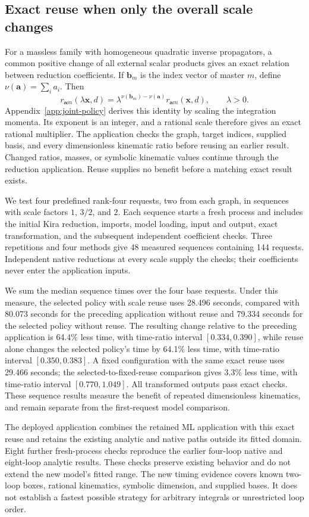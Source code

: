 \subsection{Exact reuse when only the overall scale changes}
For a massless family with homogeneous quadratic inverse propagators, a common positive change of all external scalar products gives an exact relation between reduction coefficients. If $\boldsymbol b_m$ is the index vector of master $m$, define $\nu(\boldsymbol a)=\sum_i a_i$. Then
\begin{equation}
 r_{\boldsymbol a m}(\lambda\boldsymbol x,d)
 =\lambda^{\nu(\boldsymbol b_m)-\nu(\boldsymbol a)}
  r_{\boldsymbol a m}(\boldsymbol x,d),\qquad\lambda>0.
 \label{eq:joint-scale-rule}
\end{equation}
Appendix~\ref{app:joint-policy} derives this identity by scaling the integration momenta. Its exponent is an integer, and a rational scale therefore gives an exact rational multiplier. The application checks the graph, target indices, supplied basis, and every dimensionless kinematic ratio before reusing an earlier result. Changed ratios, masses, or symbolic kinematic values continue through the reduction application. Reuse supplies no benefit before a matching exact result exists.

We test four predefined rank-four requests, two from each graph, in sequences with scale factors $1$, $3/2$, and $2$. Each sequence starts a fresh process and includes the initial Kira reduction, imports, model loading, input and output, exact transformation, and the subsequent independent coefficient checks. Three repetitions and four methods give 48 measured sequences containing 144 requests. Independent native reductions at every scale supply the checks; their coefficients never enter the application inputs.

We sum the median sequence times over the four base requests. Under this measure, the selected policy with scale reuse uses 28.496 seconds, compared with 80.073 seconds for the preceding application without reuse and 79.334 seconds for the selected policy without reuse. The resulting change relative to the preceding application is 64.4\% less time, with time-ratio interval $[0.334,0.390]$, while reuse alone changes the selected policy's time by 64.1\% less time, with time-ratio interval $[0.350,0.383]$. A fixed configuration with the same exact reuse uses 29.466 seconds; the selected-to-fixed-reuse comparison gives 3.3\% less time, with time-ratio interval $[0.770,1.049]$. All transformed outputs pass exact checks. These sequence results measure the benefit of repeated dimensionless kinematics, and remain separate from the first-request model comparison.

The deployed application combines the retained ML application with this exact reuse and retains the existing analytic and native paths outside its fitted domain. Eight further fresh-process checks reproduce the earlier four-loop native and eight-loop analytic results. These checks preserve existing behavior and do not extend the new model's fitted range. The new timing evidence covers known two-loop boxes, rational kinematics, symbolic dimension, and supplied bases. It does not establish a fastest possible strategy for arbitrary integrals or unrestricted loop order.
